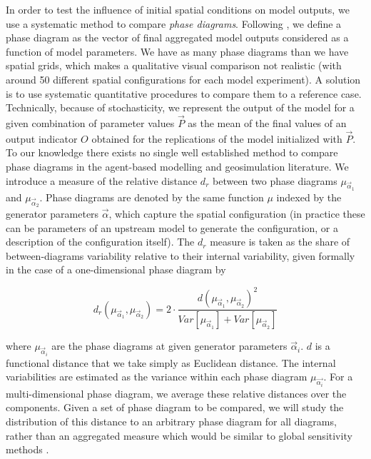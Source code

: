 \documentclass{JASSS}
\begin{document}
In order to test the influence of initial spatial conditions on model outputs, we use a systematic method to compare \emph{phase diagrams}. Following \citet{Gauvinetal2009}, we define a phase diagram as the vector of final aggregated model outputs considered as a function of model parameters. We have as many phase diagrams than we have spatial grids, which makes a qualitative visual comparison not realistic (with around 50 different spatial configurations for each model experiment). A solution is to use systematic quantitative procedures to compare them to a reference case. Technically, because of stochasticity, we represent the output of the model for a given combination of parameter values $\vec{P}$ as the mean of the final values of an output indicator $O$ obtained for the replications of the model initialized with $\vec{P}$.\\

To our knowledge there exists no single well established method to compare phase diagrams in the agent-based modelling and geosimulation literature. We introduce a measure of the relative distance $d_r$ between two phase diagrams $\mu_{\vec{\alpha}_1}$ and $\mu_{\vec{\alpha}_2}$. Phase diagrams are denoted by the same function $\mu$ indexed by the generator parameters $\vec{\alpha}$, which capture the spatial configuration (in practice these can be parameters of an upstream model to generate the configuration, or a description of the configuration itself). The $d_r$ measure is taken as the share of between-diagrams variability relative to their internal variability, given formally in the case of a one-dimensional phase diagram by


\begin{equation}\label{eq:phase-distance}
d_r\left(\mu_{\vec{\alpha}_1},\mu_{\vec{\alpha}_2}\right) = 2 \cdot \frac{d(\mu_{\vec{\alpha}_1},\mu_{\vec{\alpha}_2})^2}{Var\left[\mu_{\vec{\alpha}_1}\right] + Var\left[\mu_{\vec{\alpha}_2}\right]}
\end{equation}

where $\mu_{\vec{\alpha}_i}$ are the phase diagrams at given generator parameters $\vec{\alpha}_i$. $d$ is a functional distance that we take simply as Euclidean distance. The internal variabilities are estimated as the variance within each phase diagram $\mu_{\vec{\alpha_i}}$. For a multi-dimensional phase diagram, we average these relative distances over the components. Given a set of phase diagram to be compared, we will study the distribution of this distance to an arbitrary phase diagram for all diagrams, rather than an aggregated measure which would be similar to global sensitivity methods \citep{saltelli2008global}.
\end{document}
